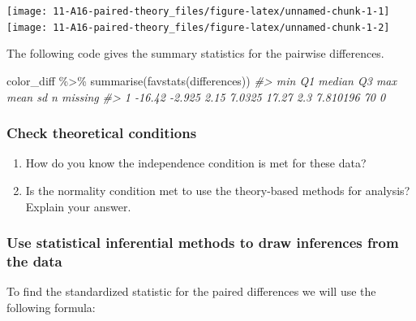\documentclass[
]{report}
\newenvironment{Shaded}{\begin{snugshade}}{\end{snugshade}}
\newcommand{\CommentTok}[1]{\textcolor[rgb]{0.56,0.35,0.01}{\textit{#1}}}
\newcommand{\FunctionTok}[1]{\textcolor[rgb]{0.00,0.00,0.00}{#1}}
\newcommand{\NormalTok}[1]{#1}
\newcommand{\SpecialCharTok}[1]{\textcolor[rgb]{0.00,0.00,0.00}{#1}}
\begin{document}
\begin{center}\texttt{[image: 11-A16-paired-theory\_files/figure-latex/unnamed-chunk-1-1]} \texttt{[image: 11-A16-paired-theory\_files/figure-latex/unnamed-chunk-1-2]} \end{center}

The following code gives the summary statistics for the pairwise differences.

\begin{Shaded}
\begin{Highlighting}[]
\NormalTok{color\_diff }\SpecialCharTok{\%\textgreater{}\%} 
  \FunctionTok{summarise}\NormalTok{(}\FunctionTok{favstats}\NormalTok{(differences))}
\CommentTok{\#\textgreater{}      min     Q1 median     Q3   max mean       sd  n missing}
\CommentTok{\#\textgreater{} 1 {-}16.42 {-}2.925   2.15 7.0325 17.27  2.3 7.810196 70       0}
\end{Highlighting}
\end{Shaded}

\hypertarget{check-theoretical-conditions}{%
\subsubsection*{Check theoretical conditions}\label{check-theoretical-conditions}}

\begin{enumerate}
\def\labelenumi{\arabic{enumi}.}
\setcounter{enumi}{4}
\item
  How do you know the independence condition is met for these data?
  \vspace{0.8in}
\item
  Is the normality condition met to use the theory-based methods for analysis? Explain your answer.
  \vspace{1in}
\end{enumerate}

\hypertarget{use-statistical-inferential-methods-to-draw-inferences-from-the-data-1}{%
\subsubsection*{Use statistical inferential methods to draw inferences from the data}\label{use-statistical-inferential-methods-to-draw-inferences-from-the-data-1}}

To find the standardized statistic for the paired differences we will use the following formula:
\end{document}
